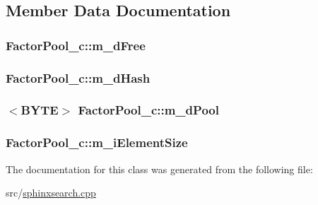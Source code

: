 \subsection{Member Data Documentation}
\hypertarget{classFactorPool__c_a346e589e7a98dbce51049d6eec4e53f1}{
\subsubsection[{m\-\_\-d\-Free}]{ Factor\-Pool\-\_\-c\-::m\-\_\-d\-Free\hspace{0.3cm}{\ttfamily [private]}}}\label{classFactorPool__c_a346e589e7a98dbce51049d6eec4e53f1}
\hypertarget{classFactorPool__c_a133127dd7c4a066892912f37d940b2fb}{
\subsubsection[{m\-\_\-d\-Hash}]{ Factor\-Pool\-\_\-c\-::m\-\_\-d\-Hash\hspace{0.3cm}{\ttfamily [private]}}}\label{classFactorPool__c_a133127dd7c4a066892912f37d940b2fb}
\hypertarget{classFactorPool__c_a74c68e829a00e961470d73356f3c1a82}{
\subsubsection[{m\-\_\-d\-Pool}]{$<${\bf B\-Y\-T\-E}$>$ Factor\-Pool\-\_\-c\-::m\-\_\-d\-Pool\hspace{0.3cm}{\ttfamily [private]}}}\label{classFactorPool__c_a74c68e829a00e961470d73356f3c1a82}
\hypertarget{classFactorPool__c_a51c57e60009fab7fcb3d7b839ad0ab1d}{
\subsubsection[{m\-\_\-i\-Element\-Size}]{ Factor\-Pool\-\_\-c\-::m\-\_\-i\-Element\-Size\hspace{0.3cm}{\ttfamily [private]}}}\label{classFactorPool__c_a51c57e60009fab7fcb3d7b839ad0ab1d}


The documentation for this class was generated from the following file\-:\begin{DoxyCompactItemize}
\item 
src/\hyperlink{sphinxsearch_8cpp}{sphinxsearch.\-cpp}\end{DoxyCompactItemize}
